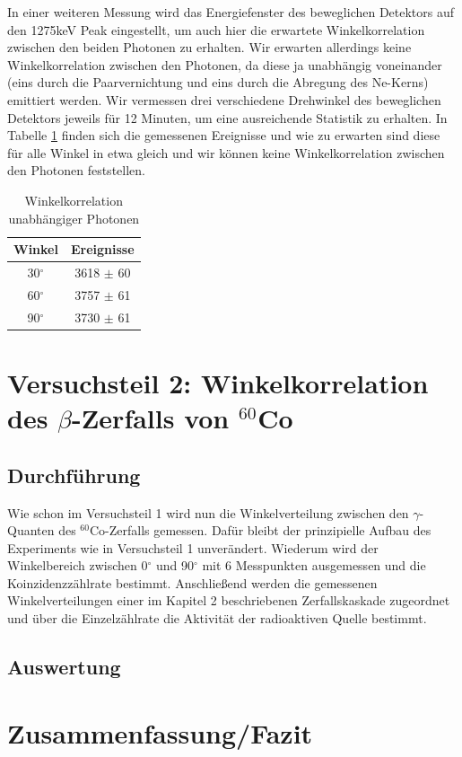 \documentclass[11pt]{scrartcl}
\begin{document}
In einer weiteren Messung wird das Energiefenster des beweglichen Detektors auf den 1275keV Peak eingestellt, um auch hier die erwartete Winkelkorrelation zwischen den beiden Photonen zu erhalten. Wir erwarten allerdings keine Winkelkorrelation zwischen den Photonen, da diese ja unabhängig voneinander (eins durch die Paarvernichtung und eins durch die Abregung des Ne-Kerns) emittiert werden. Wir vermessen drei verschiedene Drehwinkel des beweglichen Detektors jeweils für 12 Minuten, um eine ausreichende Statistik zu erhalten. In Tabelle \ref{Vergleich} finden sich die gemessenen Ereignisse und wie zu erwarten sind diese für alle Winkel in etwa gleich und wir können keine Winkelkorrelation zwischen den Photonen feststellen.

\begin{table}[h]
	\caption{Winkelkorrelation unabhängiger Photonen}
	\begin{tabular}{|c|c|}
	\hline
	 Winkel & Ereignisse\\ \hline
	 30$^\circ$ & 3618 $\pm$ 60\\ \hline
	 60$^\circ$ & 3757 $\pm$ 61\\ \hline
	 90$^\circ$ & 3730 $\pm$ 61\\ \hline
	\end{tabular}
\label{Vergleich}
\end{table}

\section{Versuchsteil 2: Winkelkorrelation des $\beta$-Zerfalls von $^{60}$Co}

\subsection{Durchführung}

Wie schon im Versuchsteil 1 wird nun die Winkelverteilung zwischen den $\gamma$-Quanten des $^{60}$Co-Zerfalls gemessen. Dafür bleibt der prinzipielle Aufbau des Experiments wie in Versuchsteil 1 unverändert. Wiederum wird der Winkelbereich zwischen 0$^\circ$ und 90$^\circ$ mit 6 Messpunkten ausgemessen und die Koinzidenzzählrate bestimmt. Anschließend werden die gemessenen Winkelverteilungen einer im Kapitel 2 beschriebenen Zerfallskaskade zugeordnet und über die Einzelzählrate die Aktivität der radioaktiven Quelle bestimmt. 

\subsection{Auswertung}




\section{Zusammenfassung/Fazit}




\end{document}
